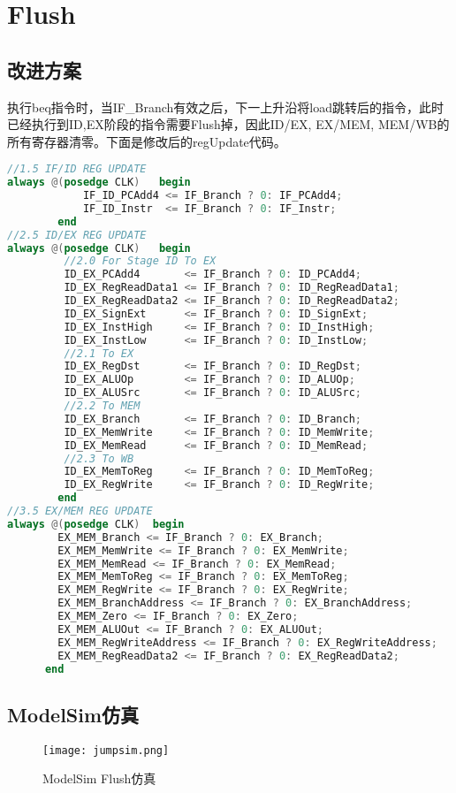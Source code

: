 \documentclass[a4paper]{article}
\begin{document}
    \section{Flush}
    \subsection{改进方案}
    执行beq指令时，当IF_Branch有效之后，下一上升沿将load跳转后的指令，此时已经执行到ID,EX阶段的指令需要Flush掉，因此ID/EX, EX/MEM, MEM/WB的所有寄存器清零。下面是修改后的regUpdate代码。
     \begin{lstlisting}[language={Verilog},title={regUpdate.v}]
//1.5 IF/ID REG UPDATE
always @(posedge CLK)	begin
			IF_ID_PCAdd4 <= IF_Branch ? 0: IF_PCAdd4;
			IF_ID_Instr  <= IF_Branch ? 0: IF_Instr;
		end
//2.5 ID/EX REG UPDATE
always @(posedge CLK)	begin
	     //2.0 For Stage ID To EX
	     ID_EX_PCAdd4       <= IF_Branch ? 0: ID_PCAdd4;
	     ID_EX_RegReadData1 <= IF_Branch ? 0: ID_RegReadData1;
	     ID_EX_RegReadData2 <= IF_Branch ? 0: ID_RegReadData2;
	     ID_EX_SignExt      <= IF_Branch ? 0: ID_SignExt;
	     ID_EX_InstHigh     <= IF_Branch ? 0: ID_InstHigh;
	     ID_EX_InstLow      <= IF_Branch ? 0: ID_InstLow;
	     //2.1 To EX
	     ID_EX_RegDst       <= IF_Branch ? 0: ID_RegDst;
	     ID_EX_ALUOp        <= IF_Branch ? 0: ID_ALUOp;
	     ID_EX_ALUSrc       <= IF_Branch ? 0: ID_ALUSrc;
	     //2.2 To MEM
	     ID_EX_Branch       <= IF_Branch ? 0: ID_Branch;
	     ID_EX_MemWrite     <= IF_Branch ? 0: ID_MemWrite;
	     ID_EX_MemRead      <= IF_Branch ? 0: ID_MemRead;
	     //2.3 To WB
	     ID_EX_MemToReg     <= IF_Branch ? 0: ID_MemToReg;
	     ID_EX_RegWrite     <= IF_Branch ? 0: ID_RegWrite;
		end
//3.5 EX/MEM REG UPDATE
always @(posedge CLK)  begin
        EX_MEM_Branch <= IF_Branch ? 0: EX_Branch;
        EX_MEM_MemWrite <= IF_Branch ? 0: EX_MemWrite;
        EX_MEM_MemRead <= IF_Branch ? 0: EX_MemRead;
        EX_MEM_MemToReg <= IF_Branch ? 0: EX_MemToReg;
        EX_MEM_RegWrite <= IF_Branch ? 0: EX_RegWrite;
        EX_MEM_BranchAddress <= IF_Branch ? 0: EX_BranchAddress;
        EX_MEM_Zero <= IF_Branch ? 0: EX_Zero;
        EX_MEM_ALUOut <= IF_Branch ? 0: EX_ALUOut;
        EX_MEM_RegWriteAddress <= IF_Branch ? 0: EX_RegWriteAddress;
        EX_MEM_RegReadData2 <= IF_Branch ? 0: EX_RegReadData2;
	  end  \end{lstlisting}

    \subsection{ModelSim仿真}
\begin{figure}[h]
  \centering
  \texttt{[image: jumpsim.png]}
  \caption{ModelSim Flush仿真}
\end{figure}
\end{document}
